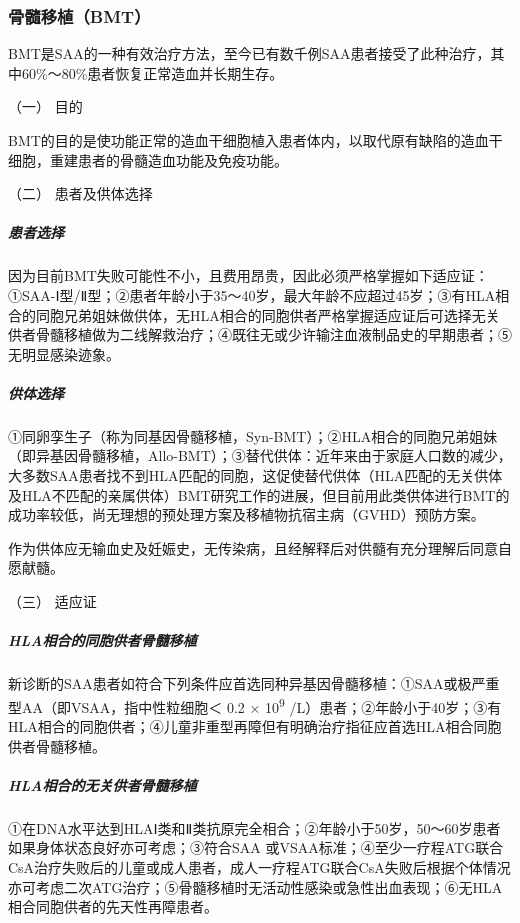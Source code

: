 \subsubsection{骨髓移植（BMT）}

BMT是SAA的一种有效治疗方法，至今已有数千例SAA患者接受了此种治疗，其中60\%～80\%患者恢复正常造血并长期生存。

\hypertarget{text00089.htmlux5cux23CHP3-10-1-3-2-1}{}
（一） 目的

BMT的目的是使功能正常的造血干细胞植入患者体内，以取代原有缺陷的造血干细胞，重建患者的骨髓造血功能及免疫功能。

\hypertarget{text00089.htmlux5cux23CHP3-10-1-3-2-2}{}
（二） 患者及供体选择

\subparagraph{患者选择}

因为目前BMT失败可能性不小，且费用昂贵，因此必须严格掌握如下适应证：①SAA-Ⅰ型/Ⅱ型；②患者年龄小于35～40岁，最大年龄不应超过45岁；③有HLA相合的同胞兄弟姐妹做供体，无HLA相合的同胞供者严格掌握适应证后可选择无关供者骨髓移植做为二线解救治疗；④既往无或少许输注血液制品史的早期患者；⑤无明显感染迹象。

\subparagraph{供体选择}

①同卵孪生子（称为同基因骨髓移植，Syn-BMT）；②HLA相合的同胞兄弟姐妹（即异基因骨髓移植，Allo-BMT）；③替代供体：近年来由于家庭人口数的减少，大多数SAA患者找不到HLA匹配的同胞，这促使替代供体（HLA匹配的无关供体及HLA不匹配的亲属供体）BMT研究工作的进展，但目前用此类供体进行BMT的成功率较低，尚无理想的预处理方案及移植物抗宿主病（GVHD）预防方案。

作为供体应无输血史及妊娠史，无传染病，且经解释后对供髓有充分理解后同意自愿献髓。

\hypertarget{text00089.htmlux5cux23CHP3-10-1-3-2-3}{}
（三） 适应证

\subparagraph{HLA相合的同胞供者骨髓移植}

新诊断的SAA患者如符合下列条件应首选同种异基因骨髓移植：①SAA或极严重型AA（即VSAA，指中性粒细胞＜
0.2 × 10\textsuperscript{9}
/L）患者；②年龄小于40岁；③有HLA相合的同胞供者；④儿童非重型再障但有明确治疗指征应首选HLA相合同胞供者骨髓移植。

\subparagraph{HLA相合的无关供者骨髓移植}

①在DNA水平达到HLAⅠ类和Ⅱ类抗原完全相合；②年龄小于50岁，50～60岁患者如果身体状态良好亦可考虑；③符合SAA
或VSAA标准；④至少一疗程ATG联合CsA治疗失败后的儿童或成人患者，成人一疗程ATG联合CsA失败后根据个体情况亦可考虑二次ATG治疗；⑤骨髓移植时无活动性感染或急性出血表现；⑥无HLA相合同胞供者的先天性再障患者。

